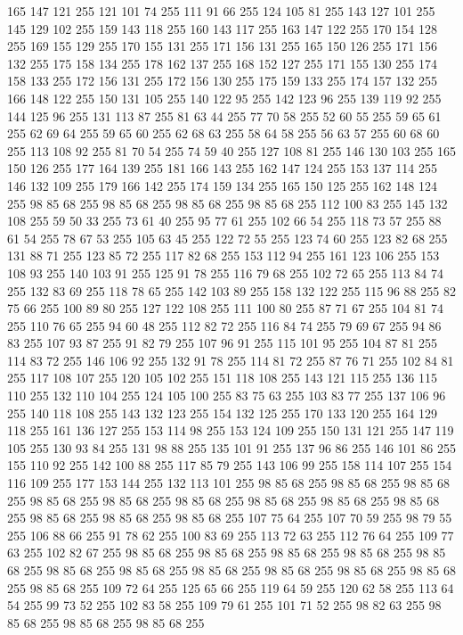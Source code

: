 165 147 121 255 121 101 74 255 111 91 66 255 124 105 81 255 143 127 101 255 145 129 102 255 159 143 118 255 160 143 117 255 163 147 122 255 170 154 128 255 169 155 129 255 170 155 131 255 171 156 131 255 165 150 126 255 171 156 132 255 175 158 134 255 178 162 137 255 168 152 127 255 171 155 130 255 174 158 133 255 172 156 131 255 172 156 130 255 175 159 133 255 174 157 132 255 166 148 122 255 150 131 105 255 140 122 95 255 142 123 96 255 139 119 92 255 144 125 96 255 131 113 87 255 81 63 44 255 77 70 58 255 52 60 55 255 59 65 61 255 62 69 64 255 59 65 60 255 62 68 63 255 58 64 58 255 56 63 57 255 60 68 60 255 113 108 92 255 81 70 54 255 74 59 40 255 127 108 81 255 146 130 103 255 165 150 126 255 177 164 139 255 181 166 143 255 162 147 124 255 153 137 114 255 146 132 109 255 179 166 142 255 174 159 134 255 165 150 125 255 162 148 124 255 98 85 68 255 98 85 68 255 98 85 68 255 98 85 68 255 112 100 83 255 145 132 108 255 59 50 33 255 73 61 40 255
95 77 61 255 102 66 54 255 118 73 57 255 88 61 54 255 78 67 53 255 105 63 45 255 122 72 55 255 123 74 60 255 123 82 68 255 131 88 71 255 123 85 72 255 117 82 68 255 153 112 94 255 161 123 106 255 153 108 93 255 140 103 91 255 125 91 78 255 116 79 68 255 102 72 65 255 113 84 74 255 132 83 69 255 118 78 65 255 142 103 89 255 158 132 122 255 115 96 88 255 82 75 66 255 100 89 80 255 127 122 108 255 111 100 80 255 87 71 67 255 104 81 74 255 110 76 65 255 94 60 48 255 112 82 72 255 116 84 74 255 79 69 67 255 94 86 83 255 107 93 87 255 91 82 79 255 107 96 91 255 115 101 95 255 104 87 81 255 114 83 72 255 146 106 92 255 132 91 78 255 114 81 72 255 87 76 71 255 102 84 81 255 117 108 107 255 120 105 102 255 151 118 108 255 143 121 115 255 136 115 110 255 132 110 104 255 124 105 100 255 83 75 63 255 103 83 77 255 137 106 96 255 140 118 108 255 143 132 123 255 154 132 125 255 170 133 120 255 164 129 118 255 161 136 127 255
153 114 98 255 153 124 109 255 150 131 121 255 147 119 105 255 130 93 84 255 131 98 88 255 135 101 91 255 137 96 86 255 146 101 86 255 155 110 92 255 142 100 88 255 117 85 79 255 143 106 99 255 158 114 107 255 154 116 109 255 177 153 144 255 132 113 101 255 98 85 68 255 98 85 68 255 98 85 68 255 98 85 68 255 98 85 68 255 98 85 68 255 98 85 68 255 98 85 68 255 98 85 68 255 98 85 68 255 98 85 68 255 98 85 68 255 107 75 64 255 107 70 59 255 98 79 55 255 106 88 66 255 91 78 62 255 100 83 69 255 113 72 63 255 112 76 64 255 109 77 63 255 102 82 67 255 98 85 68 255 98 85 68 255 98 85 68 255 98 85 68 255 98 85 68 255 98 85 68 255 98 85 68 255 98 85 68 255 98 85 68 255 98 85 68 255 98 85 68 255 98 85 68 255 109 72 64 255 125 65 66 255 119 64 59 255 120 62 58 255 113 64 54 255 99 73 52 255 102 83 58 255 109 79 61 255 101 71 52 255 98 82 63 255 98 85 68 255 98 85 68 255 98 85 68 255
